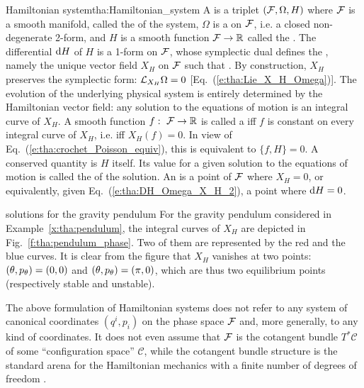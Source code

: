 \begin{tprop}{Hamiltonian system}{tha:Hamiltonian_system}
A 
is a triplet $(\mathcal{F},\Omega,H)$ where $\mathcal{F}$ is a smooth
manifold, called the  of the system, $\Omega$ is
a  on $\mathcal{F}$, i.e. a closed non-degenerate
2-form, and $H$ is a smooth function $\mathcal{F} \to \mathbb{R}$ called
the .
The differential $\mathrm{d} H$ of $H$ is a 1-form  on
$\mathcal{F}$, whose symplectic dual defines
the ,
namely the unique vector field $X_H$
on $\mathcal{F}$ such that
\be \label{e:tha:DH_Omega_X_H_2}
.
\ee
By construction, $X_H$ preserves the symplectic
form: $\mathcal{L}_{X_H} \Omega = 0$ [Eq.~(\ref{e:tha:Lie_X_H_Omega})].
The evolution of the underlying physical system is entirely determined
by the Hamiltonian vector field: any solution to the equations of motion
is an integral curve of $X_H$.
A smooth function $f: \ \mathcal{F} \to \mathbb{R}$ is called a
 iff $f$ is constant on every integral curve
of $X_H$, i.e. iff $X_H(f) = 0$. In view of Eq.~(\ref{e:tha:crochet_Poisson_equiv}),
this is equivalent to $\{f,H\} = 0$.
A conserved quantity is $H$ itself. Its value for a given solution to the equations of motion
is called the  of the solution.
An  is a point of $\mathcal{F}$ where $X_H = 0$,
or equivalently, given Eq.~(\ref{e:tha:DH_Omega_X_H_2}), a point where
$\mathrm{d} H = 0$.
\end{tprop}

\begin{texample}{solutions for the gravity pendulum}{}
For the gravity pendulum considered in Example~\ref{x:tha:pendulum},
the integral curves of $X_H$ are depicted in Fig.~\ref{f:tha:pendulum_phase}.
Two of them are
represented by the red and the blue curves. It is clear from the figure
that $X_H$ vanishes at two points: $(\theta,p_\theta) = (0,0)$ and $(\theta,p_\theta) = (\pi,0)$,
which are thus two equilibrium points (respectively stable and unstable).
\end{texample}


\begin{remark}
\label{r:tha:Ham_syst_no_canonical_coord}
The above formulation of Hamiltonian systems does not
refer to any system of canonical coordinates $(q^i, p_i)$ on
the phase space $\mathcal{F}$
and, more generally, to any kind of coordinates.
It does not even assume that $\mathcal{F}$ is the cotangent bundle $T^*\mathcal{C}$
of some ``configuration space'' $\mathcal{C}$,
while the cotangent bundle structure is the standard
arena for the Hamiltonian mechanics with a finite number of degrees
of freedom \cite{AbrahM78}.
\end{remark}

